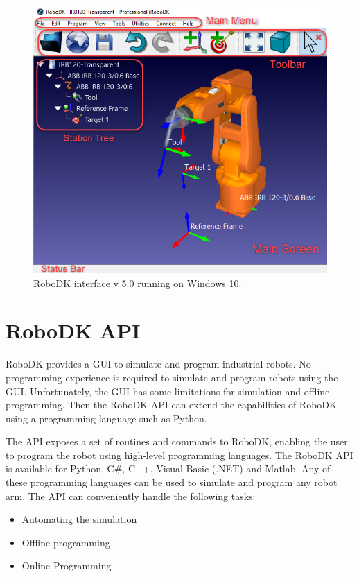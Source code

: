 \begin{figure}[h]
    \centering
    \includegraphics[width=0.9\linewidth]{img/robodk_interface.png}
    \caption{RoboDK interface v 5.0 running on Windows 10.}
    \label{fig:robodkinterface}
\end{figure}

\section{RoboDK API}

RoboDK provides a GUI to simulate and program industrial robots. No programming experience is required to simulate and program robots using the GUI. Unfortunately, the GUI has some limitations for simulation and offline programming. Then the RoboDK API can extend the capabilities of RoboDK using a programming language such as Python.

The API exposes a set of routines and commands to RoboDK, enabling the user to program the robot using high-level programming languages. The RoboDK API is available for Python, C#, C++, Visual Basic (.NET) and Matlab. Any of these programming languages can be used to simulate and program any robot arm. The API can conveniently handle the following tasks:

\begin{itemize}
    \item Automating the simulation
    \item Offline programming
    \item Online Programming
\end{itemize}


